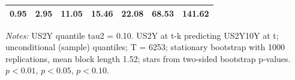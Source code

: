\begin{table}[htbp]
\begin{tabular}{lcccccc}
0.95 & 2.95 & 11.05\sym{**} & 15.46\sym{**} & 22.08\sym{**} & 68.53\sym{***} & 141.62\sym{***} \\
\bottomrule
\end{tabular}
\par\smallskip\begin{minipage}{0.95\linewidth}\footnotesize\textit{Notes:} US2Y quantile tau2 = 0.10. US2Y at t-k predicting US2Y10Y at t; unconditional (sample) quantiles; T = 6253; stationary bootstrap with 1000 replications, mean block length 1.52; stars from two-sided bootstrap p-values. \sym{***} $p<0.01$, \sym{**} $p<0.05$, \sym{*} $p<0.10$.\end{minipage}
\end{table}